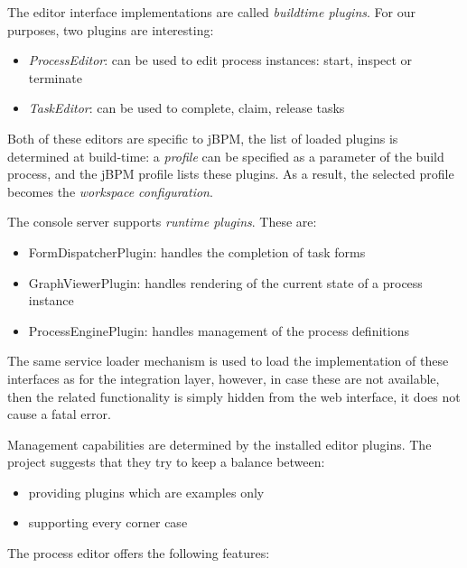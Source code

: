 The editor interface implementations are called \emph{buildtime plugins}. For our
purposes, two plugins are interesting:

\begin{itemize}
\item \emph{ProcessEditor}: can be used to edit process instances: start, inspect or terminate
\item \emph{TaskEditor}: can be used to complete, claim, release tasks
\end{itemize}

Both of these editors are specific to jBPM, the list of loaded plugins is
determined at build-time: a \emph{profile} can be specified as a parameter of the
build process, and the jBPM profile lists these plugins. As a result, the
selected profile becomes the \emph{workspace configuration}.

The console server supports \emph{runtime plugins}. These are:

\begin{itemize}
\item FormDispatcherPlugin: handles the completion of task forms
\item GraphViewerPlugin: handles rendering of the current state of a process instance
\item ProcessEnginePlugin: handles management of the process definitions
\end{itemize}

The same service loader mechanism is used to load the implementation of these
interfaces as for the integration layer, however, in case these are not
available, then the related functionality is simply hidden from the web
interface, it does not cause a fatal error.


Management capabilities are determined by the installed editor plugins. The
project suggests that they try to keep a balance between:

\begin{itemize}
\item providing plugins which are examples only
\item supporting every corner case
\end{itemize}

The process editor offers the following features:

